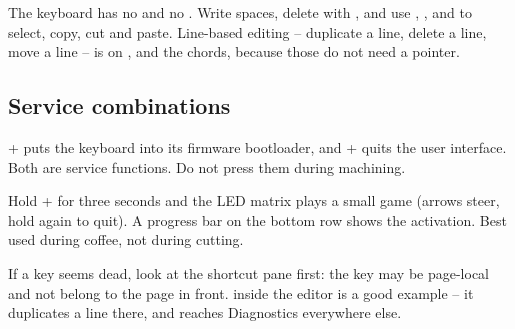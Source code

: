 The keyboard has no  and no . Write spaces, delete with
, and use , ,  and
 to select, copy, cut and paste. Line-based editing -- duplicate a line,
delete a line, move a line -- is on ,  and the
 chords, because those do not need a pointer.

\subsection*{Service combinations}
\label{sec:kbtips}

\begin{cautionbox}
  + puts the keyboard into its firmware bootloader, and
  + quits the user interface. Both are service functions. Do not press
  them during machining.
\end{cautionbox}

\begin{tipbox}
  Hold + for three seconds and the LED matrix plays a small game
  (arrows steer, hold again to quit). A progress bar on the bottom row shows the activation.
  Best used during coffee, not during cutting.
\end{tipbox}

\begin{notebox}
  If a key seems dead, look at the shortcut pane first: the key may be page-local and not
  belong to the page in front.  inside the editor is a good example -- it
  duplicates a line there, and reaches Diagnostics everywhere else.
\end{notebox}
